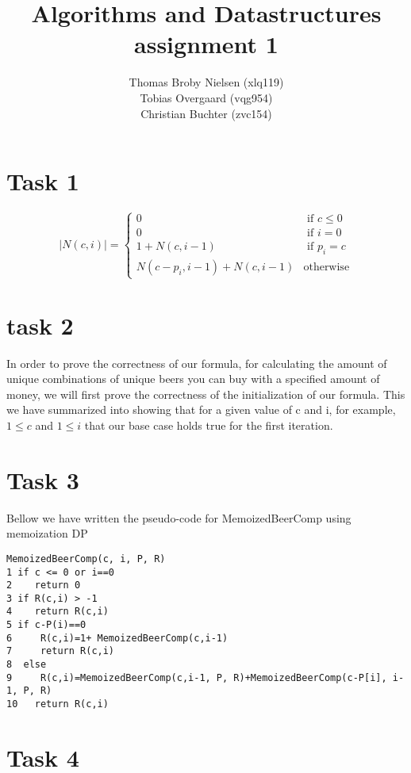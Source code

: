 \documentclass[12pt]{article}
\title{Algorithms and Datastructures assignment 1}
\author{Thomas Broby Nielsen (xlq119)\\ Tobias Overgaard (vqg954)\\ Christian Buchter (zvc154)}
\begin{document}
\maketitle

\tableofcontents

\pagebreak
\section{Task 1}
$$
|N(c,i)| = \left\{ \begin{array}{rl}
0 &\mbox{ if $c \leq 0$} \\
0 &\mbox{ if $i=0$} \\
1+N(c,i-1) &\mbox{ if $p_i=c$}\\
N(c-p_i,i-1)+N(c,i-1) &\mbox{otherwise}
\end{array} \right.
$$

\newpage
\section{task 2}
In order to prove the correctness of our formula, for calculating the amount of unique combinations of unique beers you can buy with a specified amount of money, we will first prove the correctness of the initialization of our formula. This we have summarized into showing that for a given value of c and i, for example, $1 \leq c$ and $1 \leq i$ that our base case holds true for the first iteration. 

\newpage
\section{Task 3}
Bellow we have written the pseudo-code for MemoizedBeerComp using memoization DP\\

\begin{verbatim}
MemoizedBeerComp(c, i, P, R)
1 if c <= 0 or i==0
2    return 0
3 if R(c,i) > -1
4    return R(c,i)
5 if c-P(i)==0
6     R(c,i)=1+ MemoizedBeerComp(c,i-1)
7     return R(c,i)
8  else
9     R(c,i)=MemoizedBeerComp(c,i-1, P, R)+MemoizedBeerComp(c-P[i], i-1, P, R)
10   return R(c,i)
\end{verbatim}
\section{Task 4}





\end{document}
